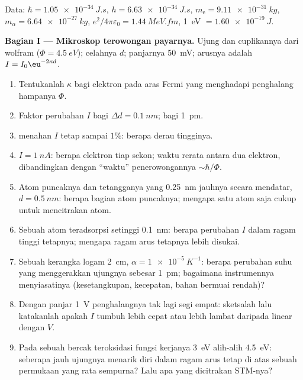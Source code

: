 \begin{problem}\label{pb:b2:potential-wells-tunneling:1}
Data: $\hbar = \qty{1.05e-34}{J.s}$, $h = \qty{6.63e-34}{J.s}$, $m_{\text{e}} =
\qty{9.11e-31}{kg}$, $m_\alpha = \qty{6.64e-27}{kg}$, $e^2/4\pi\varepsilon_0 =
\qty{1.44}{MeV.fm}$, \qty{1}{eV} $= \qty{1.60e-19}{J}$.

\textbf{Bagian I --- Mikroskop terowongan payarnya.}
Ujung dan cuplikannya dari wolfram ($\Phi = \qty{4.5}{eV}$); celahnya $d$; panjarnya
\qty{50}{mV}; arusnya adalah $I = I_0\eu^{-2\kappa d}$.
\begin{enumerate}
  \item Tentukanlah $\kappa$ bagi elektron pada aras Fermi yang menghadapi
        penghalang hampanya $\Phi$.
  \item Faktor perubahan $I$ bagi $\Delta d = \qty{0.1}{nm}$; bagi
        \qty{1}{pm}.
  \item {} menahan $I$ tetap sampai $1\%$: berapa derau tingginya.
  \item $I = \qty{1}{nA}$: berapa elektron tiap sekon; waktu rerata antara dua
        elektron, dibandingkan dengan ``waktu'' penerowongannya $\sim\hbar/\Phi$.
  \item Atom puncaknya dan tetangganya yang \qty{0.25}{nm} jauhnya secara mendatar,
        $d = \qty{0.5}{nm}$: berapa bagian atom puncaknya; mengapa satu atom saja
        cukup untuk mencitrakan atom.
  \item Sebuah atom teradsorpsi setinggi \qty{0.1}{nm}: berapa perubahan $I$ dalam
        ragam tinggi tetapnya; mengapa ragam arus tetapnya lebih disukai.
  \item Sebuah kerangka logam \qty{2}{cm}, $\alpha = \qty{1e-5}{K^{-1}}$: berapa perubahan
        suhu yang menggerakkan ujungnya sebesar \qty{1}{pm}; bagaimana instrumennya
        menyiasatinya (kesetangkupan, kecepatan, bahan bermuai rendah)?
  \item Dengan panjar \qty{1}{V} penghalangnya tak lagi segi empat:
        sketsalah lalu katakanlah apakah $I$ tumbuh lebih cepat atau lebih lambat daripada
        linear dengan $V$.
  \item Pada sebuah bercak teroksidasi fungsi kerjanya \qty{3}{eV} alih-alih
        \qty{4.5}{eV}: seberapa jauh ujungnya menarik diri dalam
        ragam arus tetap di atas sebuah permukaan yang rata sempurna? Lalu apa
        yang dicitrakan STM-nya?
\end{enumerate}


\end{problem}
